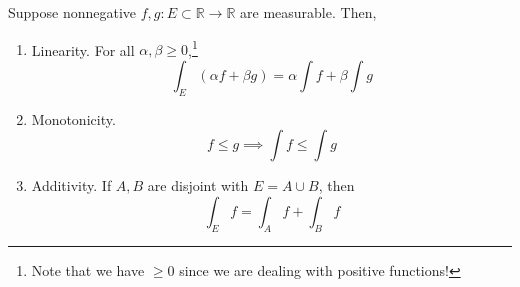   \begin{theorem}
    Suppose nonnegative $f, g: E \subset \mathbb{R} \to \mathbb{R}$ are measurable. Then, 
    \begin{enumerate}
      \item Linearity. For all $\alpha, \beta \geq 0$,\footnote{Note that we have $\geq 0$ since we are dealing with positive functions!} 
        \begin{equation}
          \int_E (\alpha f + \beta g) = \alpha \int f + \beta \int g 
        \end{equation}

      \item Monotonicity. 
        \begin{equation}
          f \leq g \implies \int f \leq \int g 
        \end{equation}

      \item Additivity. If $A, B$ are disjoint with $E = A \cup B$, then 
        \begin{equation}
          \int_E f = \int_A f + \int_B f
        \end{equation}
    \end{enumerate}
  \end{theorem}
